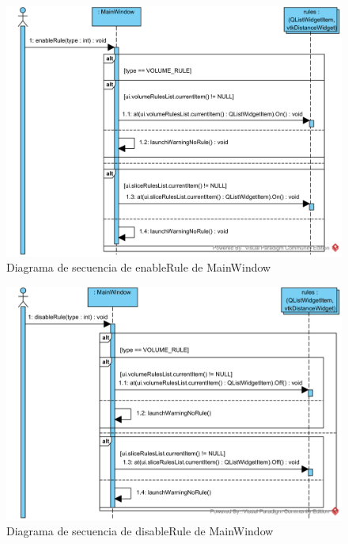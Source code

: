 \begin{figure}[H]
	\centering
	\includegraphics[width=12cm]{imagenes/diagramas/secuencia/MainWindow_EnableRule}
	\caption{Diagrama de secuencia de enableRule de MainWindow}
	\label{fig:diagrama_secuencia_mainWindow_enableRule}
\end{figure}

\begin{figure}[H]
	\centering
	\includegraphics[width=12cm]{imagenes/diagramas/secuencia/MainWindow_DisableRule}
	\caption{Diagrama de secuencia de disableRule de MainWindow}
	\label{fig:diagrama_secuencia_mainWindow_disableRule}
\end{figure}

